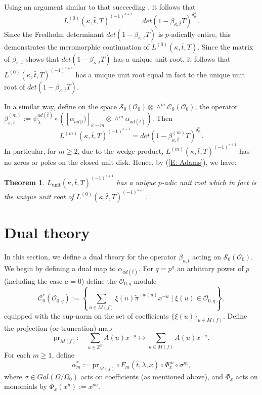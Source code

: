 \documentclass{article}
\newtheorem{theorem}{Theorem}[section]
\theoremstyle{remark}
\def\bb #1{ {\mathbb #1} }
\def\c #1{ {\mathcal #1} }
\begin{document}
Using an argument similar to that succeeding \cite[Equation 8]{MR3249829}, it follows that
\begin{equation}\label{E: A}
L^{(0)}(\kappa, \bar t, T)^{(-1)^{s+1}} = det(1 - \beta_{\kappa, \bar t} T)^{\delta_{q_{\bar t}}^{s}}.
\end{equation}
Since the Fredholm determinant $det(1 - \beta_{\kappa, \bar t} T)$ is $p$-adically entire, this demonstrates the meromorphic continuation of $L^{(0)}(\kappa, \bar t, T)$.  Since the matrix of $\beta_{\kappa, \bar t}$ shows that $det(1 - \beta_{\kappa, \bar t} T)$ has a unique unit root,  it follows  that $L^{(0)}(\kappa, \bar t, T)^{(-1)^{s+1}}$ has a unique unit root equal in fact to the unique unit root of $det(1 - \beta_{\kappa, \bar t} T).$

 In a similar way, define on the space $\c S_0(\c O_0) \otimes \wedge^m \c C_0(\c O_0)$, the operator $\beta_{\kappa, \bar t}^{(m)} := \psi_\lambda^{a d(\bar t)} \circ ([\alpha_{a d(\bar t})]_{\kappa-m} \otimes \wedge^m \alpha_{a d(\bar t)})$. Then
\[
L^{(m)}(\kappa, \bar t, T)^{(-1)^{s+1}} = det(1 - \beta_{\kappa, \bar t}^{(m)} T)^{\delta_{q_{\bar t}}^{s}}.
\]
In particular, for $m \geq 2$, due to the wedge product,  $L^{(m)}(\kappa, \bar t, T)^{(-1)^{s+1}}$ has no zeros or poles on the closed unit disk. Hence, by (\ref{E: Adams}), we have:

\begin{theorem}\label{T: unique unit}
$L_\text{unit}(\kappa, \bar t, T)^{(-1)^{s + 1}}$ has a unique $p$-adic unit root which in fact is the unique unit root of $L^{(0)}(\kappa, \bar t, T)^{(-1)^{s+1}}$.
\end{theorem}




\section{Dual theory} 

In this section, we define a dual theory for the operator $\beta_{\kappa, \bar t}$ acting on $\c S_0(\c O_0)$. We begin by defining a dual map to $\alpha_{a d(\bar t)}$. For $q = p^a$ an arbitrary power of $p$ (including the case $a = 0$) define the $\c O_{0, q}$-module
\[
\c C_0^*(\c O_{0, q}) := \left\{ \sum_{u \in M(f)} \xi(u) \tilde \pi^{-w(u)} x^{-u} \mid \xi(u) \in {\c O}_{0, q}  \right\},
\]
equipped with the sup-norm on the set of coefficients $\{ \xi(u) \}_{u \in M(f)}$.  Define the projection (or truncation) map 
\[
\text{pr}_{M(f)}: \quad \sum_{u \in \bb Z^n} A(u) x^{-u} \longmapsto \sum_{u \in M(f)} A(u) x^{-u}.
\]
For each $m \geq 1$, define
\[
\alpha_m^* := \text{pr}_{M(f)} \circ F_m(\hat t, \lambda, x) \circ \Phi_x^m \circ \sigma^m,
\]
where $\sigma \in Gal(\Omega/\Omega_0)$ acts on coefficients (as mentioned above), and $\Phi_x$ acts on monomials by $\Phi_x(x^u) := x^{p u}$.
\end{document}
